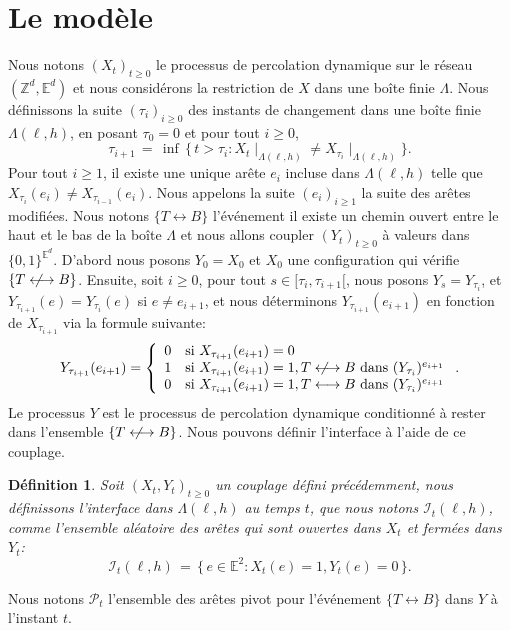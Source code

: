 \documentclass[titlepage,a4paper,12pt]{article}
\newcounter{def}
\newtheorem{defi}[def]{Définition}
\newcommand{\nlongleftrightarrow}{\longleftrightarrow \kern-15pt\not \kern15pt}
\begin{document}
\section{Le modèle}
Nous notons $(X_t)_{t\geqslant 0}$ le processus de percolation dynamique sur le réseau $(\mathbb{Z}^d,\mathbb{E}^d)$ et nous considérons la restriction de $X$ dans une boîte finie $\Lambda$. Nous définissons la suite $(\tau_i)_{i\geqslant 0}$ des instants de changement dans une boîte finie $\Lambda(\ell,h)$, en posant $\tau_0 = 0$ et pour tout $i\geqslant 0$,
$$\tau_{i+1} \,=\, \inf \,\big\{ \, t>\tau_i: {X_t}\mid_{ \Lambda(\ell,h)} \neq {X_{\tau_i}}\mid_{ \Lambda(\ell,h)} \big \}.
$$
Pour tout $i\geqslant 1$, il existe une unique arête $e_i$ incluse dans $\Lambda(\ell,h)$ telle que $X_{\tau_i}(e_i) \neq X_{\tau_{i-1}}(e_i)$. Nous appelons la suite $(e_i)_{i\geqslant 1}$ la suite des arêtes modifiées.
Nous notons $\{T\longleftrightarrow B\}$ l'événement il existe un chemin ouvert entre le haut et le bas de la boîte $\Lambda$ et nous allons coupler $(Y_t)_{t\geqslant 0}$ à valeurs dans $\{0,1\}^{\mathbb{E}^d}$. D'abord nous posons $Y_0=X_0$ et $X_0$ une configuration qui vérifie $\{T\nlongleftrightarrow B\}$. Ensuite, soit $i\geqslant 0$, pour tout $s\in [\tau_i, \tau_{i+1}[$, nous posons $Y_s = Y_{\tau_i}$, et $Y_{\tau_{i+1}}(e) =Y_{\tau_i}(e)$ si $e\neq e_{i+1}$, et nous déterminons $Y_{\tau_{i+1}}(e_{i+1})$ en fonction de $X_{\tau_{i+1}}$ via la formule suivante:
$$Y_{\tau_{i+1}}(e_{i+1})=\left\lbrace \begin{array}{cl}
0 &\text{si }X_{\tau_{i+1}}(e_{i+1}) = 0\\
1 & \text{si }X_{\tau_{i+1}}(e_{i+1}) = 1, T \nlongleftrightarrow B \text{ dans }(Y_{\tau_i})^{e_{i+1}}\\
0 & \text{si }X_{\tau_{i+1}}(e_{i+1}) = 1, T \longleftrightarrow B \text{ dans }(Y_{\tau_i})^{e_{i+1}}
\end{array}\right..$$
Le processus $Y$ est le processus de percolation dynamique conditionné à rester dans l'ensemble $\{T\nlongleftrightarrow B\}$. Nous pouvons définir l'interface à l'aide de ce couplage.
\begin{defi}
Soit $(X_t,Y_t)_{t\geqslant 0}$ un couplage défini précédemment, nous définissons l'interface dans $\Lambda({\ell,h})$ au temps $t$, que nous notons $\mathcal{I}_t({\ell,h})$, comme l'ensemble aléatoire des arêtes qui sont ouvertes dans $X_t$ et fermées dans $Y_t$: $$ \mathcal{I}_t({\ell,h}) \,=\, \big\{ \,e\in \mathbb{E}^2: X_t(e) = 1, Y_t(e) = 0 \, \big\}.
$$
\end{defi}
Nous notons $\mathcal{P}_t$ l'ensemble des arêtes pivot pour l'événement $\{T\longleftrightarrow B\}$ dans $Y$ à l'instant $t$.
\end{document}
